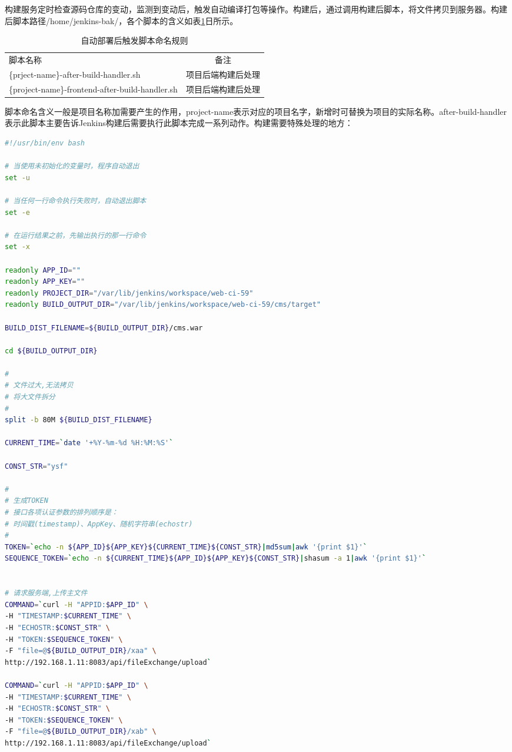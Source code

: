 \documentclass[8pt]{book}
\numberwithin{dummy}{section}
\theoremstyle{ocrenumbox}
\theoremstyle{blacknumex}
\theoremstyle{blacknumbox}
\theoremstyle{ocrenum}
\begin{document}
构建服务定时检查源码仓库的变动，监测到变动后，触发自动编译打包等操作。构建后，通过调用构建后脚本，将文件拷贝到服务器。构建后脚本路径/home/jenkins-bak/，各个脚本的含义如表\ref{table:handlernamingrule}日所示。

\begin{table}[htbp]
	\caption{自动部署后触发脚本命名规则}
	\label{table:handlernamingrule}
	\begin{center}
		\begin{tabular}{|p{7cm}|p{3.5cm}|}
			\hline
			\multirow{1}{*}{脚本名称}		 
			& \multicolumn{1}{c|}{备注}\\			
			\cline{1-2}
			\{prject-name\}-after-build-handler.sh &  项目后端构建后处理 \\
			\hline
			\{project-name\}-frontend-after-build-handler.sh  & 项目后端构建后处理 \\		
			\hline				
		\end{tabular}	
	\end{center}
\end{table}

脚本命名含义一般是项目名称加需要产生的作用，project-name表示对应的项目名字，新增时可替换为项目的实际名称。after-build-handler表示此脚本主要告诉Jenkins构建后需要执行此脚本完成一系列动作。构建需要特殊处理的地方：


\begin{lstlisting}[language=Bash]
#!/usr/bin/env bash

# 当使用未初始化的变量时，程序自动退出
set -u

# 当任何一行命令执行失败时，自动退出脚本
set -e

# 在运行结果之前，先输出执行的那一行命令
set -x

readonly APP_ID=""
readonly APP_KEY=""
readonly PROJECT_DIR="/var/lib/jenkins/workspace/web-ci-59"
readonly BUILD_OUTPUT_DIR="/var/lib/jenkins/workspace/web-ci-59/cms/target"

BUILD_DIST_FILENAME=${BUILD_OUTPUT_DIR}/cms.war

cd ${BUILD_OUTPUT_DIR}

#
# 文件过大,无法拷贝
# 将大文件拆分
#
split -b 80M ${BUILD_DIST_FILENAME}

CURRENT_TIME=`date '+%Y-%m-%d %H:%M:%S'`

CONST_STR="ysf"

#
# 生成TOKEN
# 接口各项认证参数的排列顺序是：
# 时间戳(timestamp)、AppKey、随机字符串(echostr)
#
TOKEN=`echo -n ${APP_ID}${APP_KEY}${CURRENT_TIME}${CONST_STR}|md5sum|awk '{print $1}'`
SEQUENCE_TOKEN=`echo -n ${CURRENT_TIME}${APP_ID}${APP_KEY}${CONST_STR}|shasum -a 1|awk '{print $1}'`


# 请求服务端,上传主文件
COMMAND=`curl -H "APPID:$APP_ID" \
-H "TIMESTAMP:$CURRENT_TIME" \
-H "ECHOSTR:$CONST_STR" \
-H "TOKEN:$SEQUENCE_TOKEN" \
-F "file=@${BUILD_OUTPUT_DIR}/xaa" \
http://192.168.1.11:8083/api/fileExchange/upload`

COMMAND=`curl -H "APPID:$APP_ID" \
-H "TIMESTAMP:$CURRENT_TIME" \
-H "ECHOSTR:$CONST_STR" \
-H "TOKEN:$SEQUENCE_TOKEN" \
-F "file=@${BUILD_OUTPUT_DIR}/xab" \
http://192.168.1.11:8083/api/fileExchange/upload`
\end{lstlisting}
\end{document}

